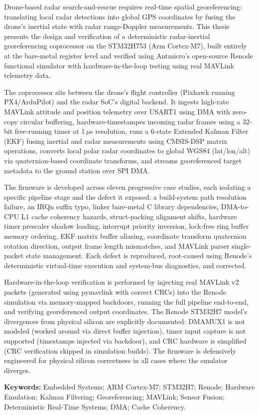 
Drone-based radar search-and-rescue requires real-time spatial georeferencing: translating local radar detections into global GPS coordinates by fusing the drone's inertial state with radar range-Doppler measurements. This thesis presents the design and verification of a deterministic radar-inertial georeferencing coprocessor on the STM32H753 (Arm Cortex-M7), built entirely at the bare-metal register level and verified using Antmicro's open-source Renode functional simulator with hardware-in-the-loop testing using real MAVLink telemetry data.

The coprocessor sits between the drone's flight controller (Pixhawk running PX4/ArduPilot) and the radar SoC's digital backend. It ingests high-rate MAVLink attitude and position telemetry over USART1 using DMA with zero-copy circular buffering, hardware-timestampes incoming radar frames using a 32-bit free-running timer at 1\,$\mu$s resolution, runs a 6-state Extended Kalman Filter (EKF) fusing inertial and radar measurements using CMSIS-DSP matrix operations, converts local polar radar coordinates to global WGS84 (lat/lon/alt) via quaternion-based coordinate transforms, and streams georeferenced target metadata to the ground station over SPI DMA.

The firmware is developed across eleven progressive case studies, each isolating a specific pipeline stage and the defect it exposed: a build-system path resolution failure, an IRQn suffix typo, linker bare-metal C library dependencies, DMA-to-CPU L1 cache coherency hazards, struct-packing alignment shifts, hardware timer prescaler shadow loading, interrupt priority inversion, lock-free ring buffer memory ordering, EKF matrix buffer aliasing, coordinate transform quaternion rotation direction, output frame length mismatches, and MAVLink parser single-packet state management. Each defect is reproduced, root-caused using Renode's deterministic virtual-time execution and system-bus diagnostics, and corrected.

Hardware-in-the-loop verification is performed by injecting real MAVLink v2 packets (generated using pymavlink with correct CRCs) into the Renode simulation via memory-mapped backdoors, running the full pipeline end-to-end, and verifying georeferenced output coordinates. The Renode STM32H7 model's divergences from physical silicon are explicitly documented: DMAMUX1 is not modeled (worked around via direct buffer injection), timer input capture is not supported (timestamps injected via backdoor), and CRC hardware is simplified (CRC verification skipped in simulation builds). The firmware is defensively engineered for physical silicon correctness in all cases where the emulator diverges.

\vspace{0.8cm}
\noindent\textbf{Keywords:} Embedded Systems; ARM Cortex-M7; STM32H7; Renode; Hardware Emulation; Kalman Filtering; Georeferencing; MAVLink; Sensor Fusion; Deterministic Real-Time Systems; DMA; Cache Coherency.